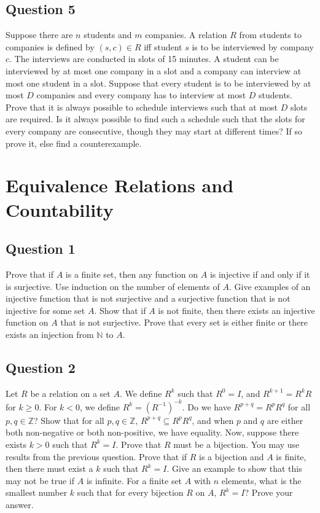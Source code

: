 \documentclass[12pt]{report}
\begin{document}
\section*{Question 5}
Suppose there are $n$ students and $m$ companies. A relation $R$ from students to companies is defined by $(s, c) \in R$ iff student $s$ is to be interviewed by company $c$. The interviews are conducted in slots of 15 minutes. A student can be interviewed by at most one company in a slot and a company can interview at most one student in a slot. Suppose that every student is to be interviewed by at most $D$ companies and every company has to interview at most $D$ students. Prove that it is always possible to schedule interviews such that at most $D$ slots are required. Is it always possible to find such a schedule such that the slots for every company are consecutive, though they may start at different times? If so prove it, else find a counterexample.
\chapter{Equivalence Relations and Countability}
\section*{Question 1}
Prove that if $A$ is a finite set, then any function on $A$ is injective if and only if it is surjective. Use induction on the number of elements of $A$. Give examples of an injective function that is not surjective and a surjective function that is not injective for some set $A$. Show that if $A$ is not finite, then there exists an injective function on $A$ that is not surjective. Prove that every set is either finite or there exists an injection from $\mathbb{N}$ to $A$.
\section*{Question 2}
Let $R$ be a relation on a set $A$. We define $R^{k}$ such that $R^{0} = I$, and $R^{k + 1} = R^{k}R$ for $k \geq 0$. For $k < 0$, we define $R^{k} = (R^{-1})^{-k}$. Do we have $R^{p + q} = R^{p}R^{q}$ for all $p, q \in \mathbb{Z}$? Show that for all $p, q \in \mathbb{Z}$, $R^{p + q} \subseteq R^{p}R^{q}$, and when $p$ and $q$ are either both non-negative or both non-positive, we have equality. Now, suppose there exists $k > 0$ such that $R^{k} = I$. Prove that $R$ must be a bijection. You may use results from the previous question. Prove that if $R$ is a bijection and $A$ is finite, then there must exist a $k$ such that $R^k = I$. Give an example to show that this may not be true if $A$ is infinite. For a finite set $A$ with $n$ elements, what is the smallest number $k$ such that for every bijection $R$ on $A$, $R^{k} = I$? Prove your answer.
\end{document}
